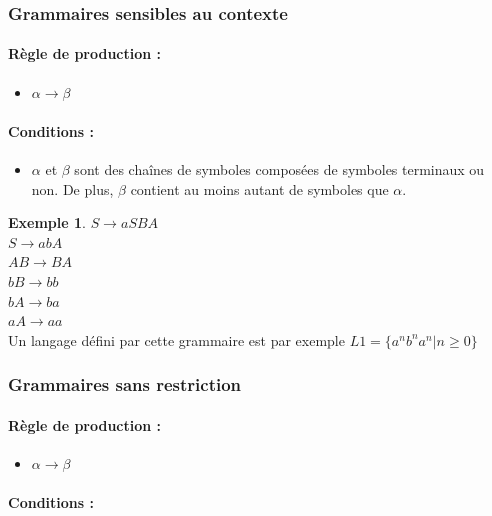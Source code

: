 \documentclass[11pt,a4paper]{article}
\theoremstyle{definition}
\newtheorem{myexem}[mydef]{Exemple}
\begin{document}
\subsubsection{Grammaires sensibles au contexte}

\paragraph{Règle de production :} 
\begin{itemize}
	\item $\alpha \rightarrow \beta$
\end{itemize}

\paragraph{Conditions :}

\begin{itemize}
	\item $\alpha$ et $\beta$ sont des chaînes de symboles composées de 
		symboles terminaux ou non. De plus, $\beta$ contient au moins 
		autant de symboles que $\alpha$.
\end{itemize}

\begin{myexem}
	$S \rightarrow aSBA$ \\
	$S \rightarrow abA$ \\
	$AB \rightarrow BA$ \\
	$bB \rightarrow bb$ \\
	$bA \rightarrow ba$ \\
	$aA \rightarrow aa$ \\
	Un langage défini par cette grammaire est par exemple $L1 =
	\{a^nb^na^n|n \geq 0\}$
\end{myexem}


\subsubsection{Grammaires sans restriction}

\paragraph{Règle de production :} 
\begin{itemize}
	\item $\alpha \rightarrow \beta$
\end{itemize}

\paragraph{Conditions :}
\end{document}
